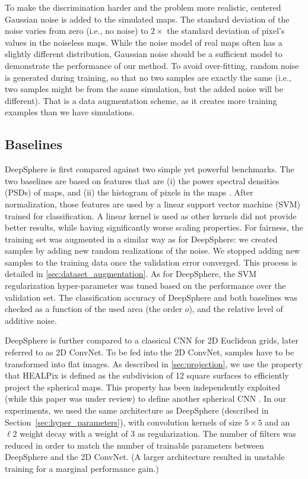 \documentclass[final,twocolumn,3p,times,sort&compress]{elsarticle}
\newcommand{\secref}[1]{Section~\ref{sec:#1}}
\newcommand{\1}{\b{1}}              %
\newcommand{\0}{\b{0}}              %
\begin{document}
To make the discrimination harder and the problem more realistic, centered Gaussian noise is added to the simulated maps.
The standard deviation of the noise varies from zero (i.e., no noise) to $2\times$ the standard deviation of pixel's values in the noiseless maps.
While the noise model of real maps often has a slightly different distribution, Gaussian noise should be a sufficient model to demonstrate the performance of our method.
To avoid over-fitting, random noise is generated during training, so that no two samples are exactly the same (i.e., two samples might be from the same simulation, but the added noise will be different).
That is a data augmentation scheme, as it creates more training examples than we have simulations.

\subsection{Baselines}

DeepSphere is first compared against two simple yet powerful benchmarks.
The two baselines are based on features that are (i) the power spectral densities (PSDs) of maps, and (ii) the histogram of pixels in the maps \citep{patton2017cosmologicalconstraints}.
After normalization, those features are used by a linear support vector machine (SVM) trained for classification.
A linear kernel is used as other kernels did not provide better results, while having significantly worse scaling properties.
For fairness, the training set was augmented in a similar way as for DeepSphere: we created samples by adding new random realizations of the noise. We stopped adding new samples to the training data once the validation error converged. This process is detailed in \ref{sec:dataset_augmentation}.
As for DeepSphere, the SVM regularization hyper-parameter was tuned based on the performance over the validation set.
The classification accuracy of DeepSphere and both baselines was checked as a function of the used area (the order $o$), and the relative level of additive noise.

DeepSphere is further compared to a classical CNN for 2D Euclidean grids, later referred to as 2D ConvNet.
To be fed into the 2D ConvNet, samples have to be transformed into flat images.
As described in \ref{sec:projection}, we use the property that HEALPix is defined as the subdivision of 12 square surfaces to efficiently project the spherical maps.
This property has been independently exploited (while this paper was under review) to define another spherical CNN \cite{krachmalnicoff2019convolutional}.
In our experiments, we used the same architecture as DeepSphere (described in \secref{hyper_parameters}), with convolution kernels of size $5 \times 5$ and an $\ell2$ weight decay with a weight of 3 as regularization.
The number of filters was reduced in order to match the number of trainable parameters between DeepSphere and the 2D ConvNet.
(A larger architecture resulted in unstable training for a marginal performance gain.)
\end{document}
